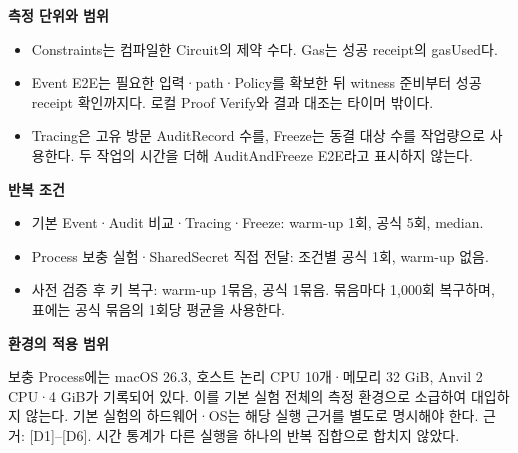 \textbf{측정 단위와 범위}
\begin{itemize}
    \item Constraints는 컴파일한 Circuit의 제약 수다. Gas는 성공 receipt의 gasUsed다.
    \item Event E2E는 필요한 입력·path·Policy를 확보한 뒤 witness 준비부터 성공 receipt 확인까지다. 로컬 Proof Verify와 결과 대조는 타이머 밖이다.
    \item Tracing은 고유 방문 AuditRecord 수를, Freeze는 동결 대상 수를 작업량으로 사용한다. 두 작업의 시간을 더해 AuditAndFreeze E2E라고 표시하지 않는다.
\end{itemize}
\textbf{반복 조건}
\begin{itemize}
    \item 기본 Event·Audit 비교·Tracing·Freeze: warm-up 1회, 공식 5회, median.
    \item Process 보충 실험·SharedSecret 직접 전달: 조건별 공식 1회, warm-up 없음.
    \item 사전 검증 후 키 복구: warm-up 1묶음, 공식 1묶음. 묶음마다 1,000회 복구하며, 표에는 공식 묶음의 1회당 평균을 사용한다.
\end{itemize}
\textbf{환경의 적용 범위}\par
보충 Process에는 macOS 26.3, 호스트 논리 CPU 10개·메모리 32 GiB, Anvil 2 CPU·4 GiB가 기록되어 있다.
이를 기본 실험 전체의 측정 환경으로 소급하여 대입하지 않는다.
기본 실험의 하드웨어·OS는 해당 실행 근거를 별도로 명시해야 한다.
    {\small 근거: [D1]--[D6]. 시간 통계가 다른 실행을 하나의 반복 집합으로 합치지 않았다.}\par
